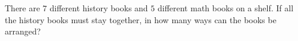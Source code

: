 There are $7$ different history books and $5$ different math books on a shelf. If all the history books must stay together, in how many ways can the books be arranged?
